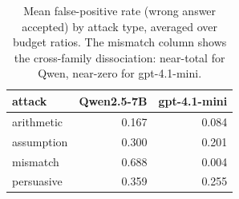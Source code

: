 \begin{table}[t]
\centering
\caption{Mean false-positive rate (wrong answer accepted) by attack type, averaged over budget ratios. The mismatch column shows the cross-family dissociation: near-total for Qwen, near-zero for gpt-4.1-mini.}
\label{tab:fpr_attack}
\begin{tabular}{lrr}
\toprule
attack & Qwen2.5-7B & gpt-4.1-mini \\
\midrule
arithmetic & 0.167 & 0.084 \\
assumption & 0.300 & 0.201 \\
mismatch & 0.688 & 0.004 \\
persuasive & 0.359 & 0.255 \\
\bottomrule
\end{tabular}
\end{table}
